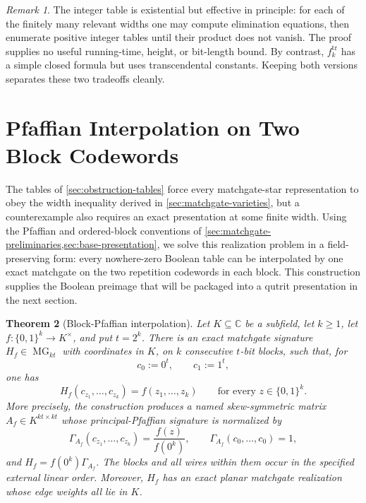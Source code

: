 \documentclass[11pt]{article}
\newtheorem{theorem}{Theorem}[section]
\theoremstyle{definition}
\theoremstyle{remark}
\newtheorem{remark}[theorem]{Remark}
\newcommand{\C}{\mathbb C}
\newcommand{\bits}{\{0,1\}}
\newcommand{\MG}{\operatorname{MG}}
\begin{document}
\begin{remark}
The integer table is existential but effective in principle: for each of
the finitely many relevant widths one may compute elimination equations,
then enumerate positive integer tables until their product does not vanish.
The proof supplies no useful running-time, height, or bit-length bound.  By
contrast, $f_k^{\mathrm{tr}}$ has a simple closed formula but uses
transcendental constants.  Keeping both versions separates these two
tradeoffs cleanly.
\end{remark}

\section{Pfaffian Interpolation on Two Block Codewords}
\label{sec:pfaffian-interpolation}

The tables of \cref{sec:obstruction-tables} force every matchgate-star
representation to obey the width inequality derived in
\cref{sec:matchgate-varieties}, but a counterexample also requires an exact
presentation at some finite width.  Using the Pfaffian and ordered-block
conventions of
\cref{sec:matchgate-preliminaries,sec:base-presentation}, we solve this
realization problem in a field-preserving form: every nowhere-zero Boolean
table can be interpolated by one exact matchgate on the two repetition
codewords in each block.  This construction supplies the Boolean preimage
that will be packaged into a qutrit presentation in the next section.

\begin{theorem}[Block-Pfaffian interpolation]
\label{thm:block-pfaffian-interpolation}
Let $K\subseteq\C$ be a subfield, let $k\ge1$, let
$f\colon\bits^k\to K^{\times}$, and put $t=2^k$.
There is an exact matchgate signature $H_f\in\MG_{kt}$ with coordinates in
$K$, on $k$ consecutive $t$-bit blocks, such that, for
\[
  c_0:=0^t,
  \qquad
  c_1:=1^t,
\]
one has
\begin{equation}
  H_f(c_{z_1},\ldots,c_{z_k})=f(z_1,\ldots,z_k)
  \qquad\text{for every }z\in\bits^k.
  \label{eq:block-interpolation-target}
\end{equation}
More precisely, the construction produces a named skew-symmetric matrix
$A_f\in K^{kt\times kt}$ whose principal-Pfaffian signature is normalized
by
\begin{equation}
  \Gamma_{A_f}(c_{z_1},\ldots,c_{z_k})
  =\frac{f(z)}{f(0^k)},
  \qquad
  \Gamma_{A_f}(c_0,\ldots,c_0)=1,
  \label{eq:block-interpolation-normalized-statement}
\end{equation}
and $H_f=f(0^k)\Gamma_{A_f}$.
The blocks and all wires within them occur in the specified external linear
order.  Moreover, $H_f$ has an exact planar matchgate realization whose
edge weights all lie in $K$.
\end{theorem}
\end{document}
